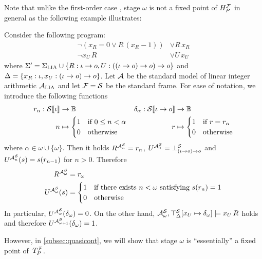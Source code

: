 \documentclass[a4paper,twoside,notitlepage,openright,11pt]{report}
\begin{document}
Note that unlike the first-order case \cite{BGMR15}, stage $\omega$ is not a fixed point of $H_P^\mathcal F$ in general as the following example illustrates:
\begin{example}
  \label{ex:notstopomega}
  Consider the following program:
  \begin{align*}
    \neg (x_R=0\lor R\,(x_R-1))&\lor R\,x_R\\
    \neg x_U\,R&\lor U\,x_U
  \end{align*}
  where $\Sigma'=\Sigma_{\operatorname{LIA}}\cup\{R:\iota\to o,U:((\iota\to o)\to o)\to o\}$ and $\Delta=\{x_R:\iota,x_U:(\iota\to o)\to o\}$. Let $\mathcal A$ be the standard model of linear integer arithmetic $\mathcal A_{\operatorname{LIA}}$ and let $\mathcal F=\mathcal S$ be the standard frame. For ease of notation, we introduce the following functions
  \begin{align*}
    r_\alpha:{\mathcal S}\llbracket\iota\rrbracket&\to\mathbb B&\delta_\alpha:{\mathcal S}\llbracket\iota\to o\rrbracket&\to\mathbb B\\
    n&\mapsto
       \begin{cases}
         1&\text{if }0\leq n<\alpha\\
         0&\text{otherwise}
       \end{cases}
                                          &r&\mapsto
        \begin{cases}
          1&\text{if }r=r_\alpha\\
          0&\text{otherwise}
        \end{cases}
  \end{align*}
  where $\alpha\in\omega\cup\{\omega\}$.
  Then it holds $R^{\mathcal A^\mathcal S_n}=r_n$, $U^{\mathcal A^\mathcal S_0}=\bot^\mathcal S_{(\iota\to o)\to o}$ and $U^{\mathcal A^\mathcal S_n}(s)=s(r_{n-1})$ for $n>0$. Therefore
  \begin{align*}
    R^{\mathcal A^\mathcal S_\omega}&=r_\omega\\
    U^{\mathcal A^\mathcal S_\omega}(s)&=
                    \begin{cases}
                      1&\text{if there exists $n<\omega$ satisfying }s(r_n)=1\\
                      0&\text{otherwise}
                    \end{cases}
  \end{align*}
  In particular, $U^{\mathcal A^\mathcal S_\omega}(\delta_\omega)=0$. On the other hand, $\mathcal A^\mathcal S_\omega,\top_\Delta^\mathcal S[x_U\mapsto \delta_\omega]\models x_U\,R$ holds and therefore $U^{\mathcal A^\mathcal S_{\omega+1}}(\delta_\omega)=1$.
\end{example}
However, in \cref{subsec:quasicont}, we will show that stage $\omega$ is ``essentially'' a fixed point of~$T_P^\mathcal F$.
\end{document}
